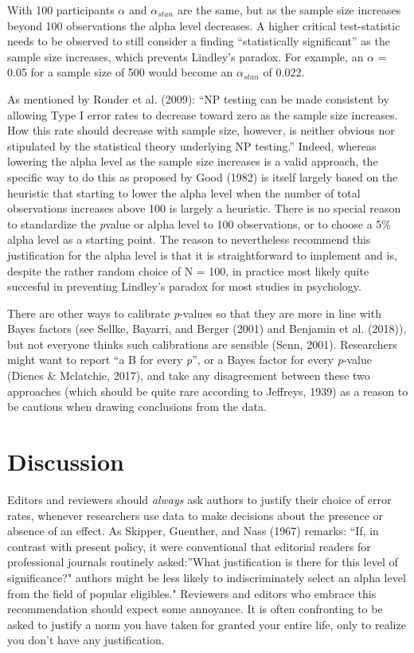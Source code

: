 \documentclass[,jou,floatsintext]{apa6}
\begin{document}
With 100 participants \(\alpha\) and \(\alpha_{stan}\) are the same, but as the sample size increases beyond 100 observations the alpha level decreases. A higher critical test-statistic needs to be observed to still consider a finding \enquote{statistically significant} as the sample size increases, which prevents Lindley's paradox. For example, an \(\alpha\) = 0.05 for a sample size of 500 would become an \(\alpha_{stan}\) of 0.022.

As mentioned by Rouder et al. (2009): \enquote{NP testing can be made consistent by allowing Type I error rates to decrease toward zero as the sample size increases. How this rate should decrease with sample size, however, is neither obvious nor stipulated by the statistical theory underlying NP testing.} Indeed, whereas lowering the alpha level as the sample size increases is a valid approach, the specific way to do this as proposed by Good (1982) is itself largely based on the heuristic that starting to lower the alpha level when the number of total observations increases above 100 is largely a heuristic. There is no special reason to standardize the \emph{p}value or alpha level to 100 observations, or to choose a 5\% alpha level as a starting point. The reason to nevertheless recommend this justification for the alpha level is that it is straightforward to implement and is, despite the rather random choice of N = 100, in practice most likely quite succesful in preventing Lindley's paradox for most studies in psychology.

There are other ways to calibrate \emph{p}-values so that they are more in line with Bayes factors (see Sellke, Bayarri, and Berger (2001) and Benjamin et al. (2018)), but not everyone thinks such calibrations are sensible (Senn, 2001). Researchers might want to report \enquote{a B for every \emph{p}}, or a Bayes factor for every \emph{p}-value (Dienes \& Mclatchie, 2017), and take any disagreement between these two approaches (which should be quite rare according to Jeffreys, 1939) as a reason to be cautious when drawing conclusions from the data.

\hypertarget{discussion}{%
\section{Discussion}\label{discussion}}

Editors and reviewers should \emph{always} ask authors to justify their choice of error rates, whenever researchers use data to make decisions about the presence or absence of an effect. As Skipper, Guenther, and Nass (1967) remarks: \enquote{If, in contrast with present policy, it were conventional that editorial readers for professional journals routinely asked:}What justification is there for this level of significance?" authors might be less likely to indiscriminately select an alpha level from the field of popular eligibles." Reviewers and editors who embrace this recommendation should expect some annoyance. It is often confronting to be asked to justify a norm you have taken for granted your entire life, only to realize you don't have any justification.
\end{document}
